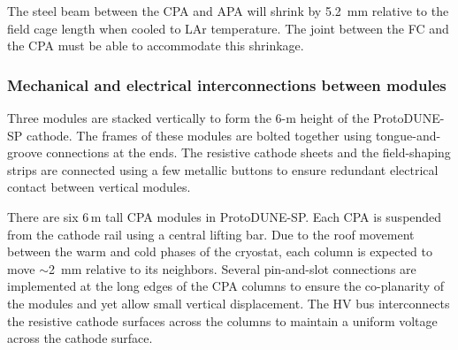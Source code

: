The steel beam between the CPA and APA will shrink by 5.2~mm relative to the field cage length when cooled to LAr temperature.  The joint between the FC and the CPA must be able to accommodate this shrinkage.



\subsubsection{Mechanical and electrical interconnections between modules}

Three modules are stacked vertically to form the 6-m height of the ProtoDUNE-SP  cathode.  The frames of these modules are bolted together using tongue-and-groove connections at the ends. The resistive cathode sheets and the field-shaping strips are connected using a few metallic buttons to ensure redundant electrical contact between vertical modules.

There are six 6\,m tall CPA modules in  ProtoDUNE-SP.  Each CPA is suspended from the cathode rail using a central lifting bar.  Due to the  roof movement between the warm and cold phases of the cryostat, each column is expected to move $\sim$2~mm relative to its neighbors.  Several pin-and-slot connections are implemented at the long edges of the CPA columns to ensure the co-planarity of the modules and yet allow small vertical displacement.  The HV bus interconnects the resistive cathode surfaces across the columns to maintain a uniform voltage across the cathode surface.


